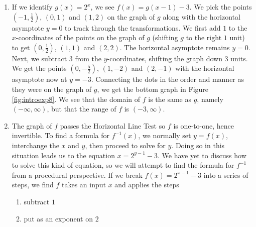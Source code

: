 {
\begin{enumerate}

\item  If we identify $g(x) = 2^{x}$, we see $f(x) = g(x-1)-3$.  We pick the points $\left(-1, \frac{1}{2}\right)$, $(0,1)$ and $(1, 2)$ on the graph of $g$ along with the horizontal asymptote $y=0$ to track through the transformations. We first add $1$ to the $x$-coordinates of the points on the graph of $g$ (shifting $g$ to the right $1$ unit) to get $\left(0, \frac{1}{2}\right)$, $(1,1)$ and $(2, 2)$.  The horizontal asymptote remains $y=0$.  Next, we subtract $3$ from the $y$-coordinates, shifting the graph down $3$ units.  We get the points $\left(0, -\frac{5}{2}\right)$, $(1,-2)$ and $(2, -1)$ with the horizontal asymptote now at $y=-3$.  Connecting the dots in the order and manner as they were on the graph of $g$, we get the bottom graph in Figure \ref{fig:introexp8}.  We see that the domain of $f$ is the same as $g$, namely $(-\infty, \infty)$, but that the range of $f$ is $(-3, \infty)$.



\item  The graph of $f$ passes the Horizontal Line Test so $f$ is one-to-one, hence invertible.  To find a formula for $f^{-1}(x)$, we normally set $y=f(x)$, interchange the $x$ and $y$, then proceed to solve for $y$.  Doing so in this situation leads us to the equation $x = 2^{y-1}-3$.  We have yet to discuss how to solve this kind of equation, so we will attempt to find the formula for $f^{-1}$ from a procedural perspective.  If we break $f(x) = 2^{x-1}-3$ into a series of steps, we find $f$ takes an input $x$ and applies the steps

\begin{enumerate}

\item subtract $1$

\item put as an exponent on $2$


\end{enumerate}
\end{enumerate}}
